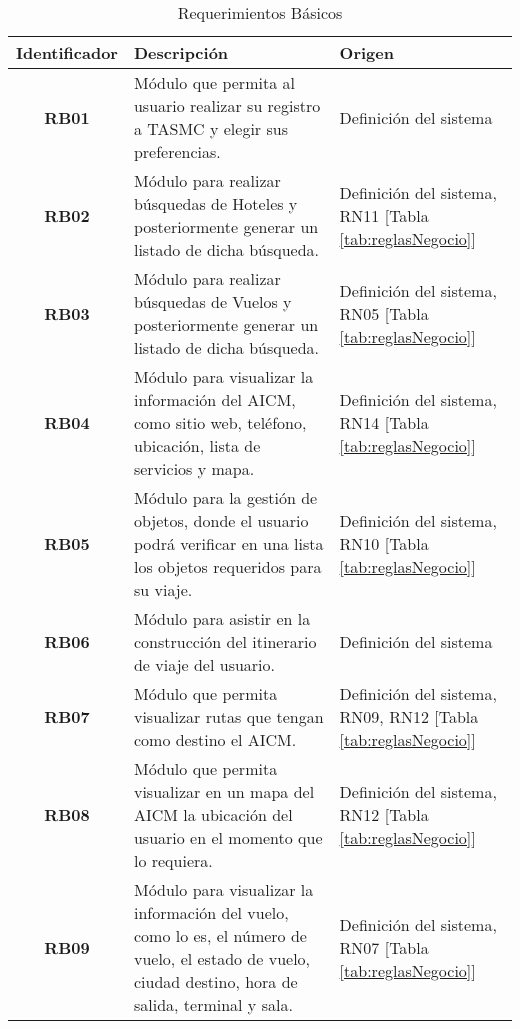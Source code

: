 \begin{table}
	\begin{center}
		\begin{tabular}{|c|p{8.4cm}|p{2.5cm}|}
			\hline \rowcolor[RGB]{51,153,255} 
				\textcolor{blanco}{\bf Identificador} &
				\textcolor{blanco}{\bf Descripción} &
				\textcolor{blanco}{\bf Origen} \\
			\hline 
				\textbf{RB01} &
				Módulo que permita al usuario realizar su registro a TASMC y elegir sus preferencias. &
				Definición del sistema  \\
      		\hline \rowcolor[RGB]{240,248,255}
      			\textbf{RB02} &
				Módulo para realizar búsquedas de Hoteles y posteriormente generar un listado de dicha búsqueda. &
				Definición del sistema, RN11 [Tabla \ref{tab:reglasNegocio}] \\
			\hline 
				\textbf{RB03} &
				Módulo para realizar búsquedas de Vuelos y posteriormente generar un listado de dicha búsqueda. &
				Definición del sistema, RN05 [Tabla \ref{tab:reglasNegocio}] \\ 
			\hline \rowcolor[RGB]{240,248,255}
				\textbf{RB04} &
				Módulo para visualizar la información del AICM, como sitio web, teléfono, ubicación, lista de servicios y mapa. &
				Definición del sistema, RN14 [Tabla \ref{tab:reglasNegocio}]\\ 
			\hline 
				\textbf{RB05} &
				Módulo para la gestión de objetos, donde el usuario podrá verificar en una lista los objetos requeridos para su viaje. &
				Definición del sistema, RN10 [Tabla \ref{tab:reglasNegocio}]\\ 
			\hline \rowcolor[RGB]{240,248,255}
				\textbf{RB06} &
				Módulo para asistir en la construcción del itinerario de viaje del usuario. &
				Definición del sistema \\ 
			\hline 
				\textbf{RB07} &
				Módulo que permita visualizar rutas que tengan como destino el AICM. &
				Definición del sistema, RN09, RN12 [Tabla \ref{tab:reglasNegocio}] \\ 
			\hline \rowcolor[RGB]{240,248,255}
				\textbf{RB08} &
				Módulo que permita visualizar en un mapa del AICM la ubicación del usuario en el momento que lo requiera. &
				Definición del sistema, RN12 [Tabla \ref{tab:reglasNegocio}] \\ 
			\hline 
				\textbf{RB09} &
				Módulo para visualizar la información del vuelo, como lo es, el número de vuelo, el estado de vuelo, ciudad destino, hora de salida, terminal y sala. &
				Definición del sistema, RN07 [Tabla \ref{tab:reglasNegocio}] \\ 
			\hline 
		\end{tabular}
	\end{center}
	\caption[Requerimientos Básicos]{Requerimientos Básicos} 
	\label{tab:reqBasicos}
\end{table}
\clearpage
\newpage
